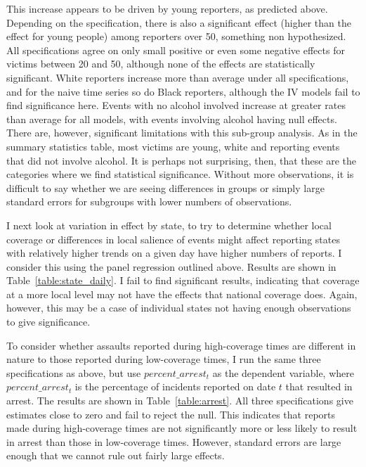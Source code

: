 \documentclass[AER,draftmode]{AEA}
\begin{document}
This increase appears to be driven by young reporters, as predicted above. Depending on the specification, there is also a significant effect (higher than the effect for young people) among reporters over 50, something non hypothesized. All specifications agree on only small positive or even some negative effects for victims between 20 and 50, although none of the effects are statistically significant. White reporters increase more than average under all specifications, and for the naive time series so do Black reporters, although the IV models fail to find significance here. Events with no alcohol involved increase at greater rates than average for all models, with events involving alcohol having null effects. There are, however, significant limitations with this sub-group analysis. As in the summary statistics table, most victims are young, white and reporting events that did not involve alcohol. It is perhaps not surprising, then, that these are the categories where we find statistical significance. Without more observations, it is difficult to say whether we are seeing differences in groups or simply large standard errors for subgroups with lower numbers of observations.

I next look at variation in effect by state, to try to determine whether local coverage or differences in local salience of events might affect reporting states with relatively higher trends on a given day have higher numbers of reports. I consider this using the  panel regression outlined above. Results are shown in Table~\ref{table:state_daily}. I fail to find significant results, indicating that coverage at a more local level may not have the effects that national coverage does. Again, however, this may be a case of individual states not having enough observations to give significance.

To consider whether assaults reported during high-coverage times are different in nature to those reported during low-coverage times, I run the same three specifications as above, but use $percent\_arrest_t$ as the dependent variable, where $percent\_arrest_t$ is the percentage of incidents reported on date $t$ that resulted in arrest. The results are shown in Table~\ref{table:arrest}. All three specifications give estimates close to zero and fail to reject the null. This indicates that reports made during high-coverage times are not significantly more or less likely to result in arrest than those in low-coverage times. However, standard errors are large enough that we cannot rule out fairly large effects.
\end{document}

